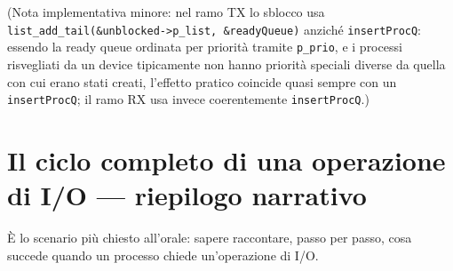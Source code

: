 \documentclass[11pt,a4paper]{article}
\newcommand{\code}[1]{\texttt{#1}}
\begin{document}
(Nota implementativa minore: nel ramo TX lo sblocco usa
\code{list\_add\_tail(\&unblocked->p\_list, \&readyQueue)} anziché
\code{insertProcQ}: essendo la ready queue ordinata per priorità tramite
\code{p\_prio}, e i processi risvegliati da un device tipicamente non hanno
priorità speciali diverse da quella con cui erano stati creati, l'effetto
pratico coincide quasi sempre con un \code{insertProcQ}; il ramo RX usa
invece coerentemente \code{insertProcQ}.)

\section{Il ciclo completo di una operazione di I/O --- riepilogo narrativo}

\`E lo scenario più chiesto all'orale: sapere raccontare, passo per passo,
cosa succede quando un processo chiede un'operazione di I/O.
\end{document}
